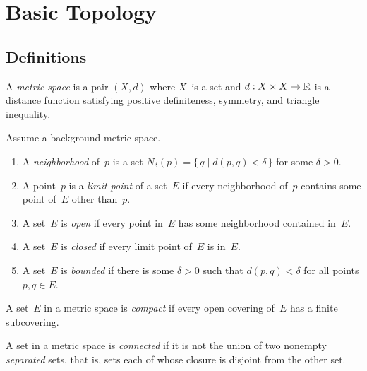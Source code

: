 %
%
%
\section{Basic Topology}
\subsection*{Definitions}
\begin{defn}
A \emph{metric space} is a pair \((X,d)\) where \(X\)~is a set and \(d:X\times X\to\mathbb{R}\) is a distance function satisfying positive definiteness, symmetry, and triangle inequality.
\end{defn}

\begin{defn}
Assume a background metric space.
\begin{enumerate}[itemsep=0pt,label=(\alph{*})]
\item A \emph{neighborhood} of~\(p\) is a set \(N_{\delta}(p)=\{\,q\mid d(p,q)<\delta\,\}\) for some \(\delta>0\).
\item A point~\(p\) is a \emph{limit point} of a set~\(E\) if every neighborhood of~\(p\) contains some point of~\(E\) other than~\(p\).
\item A set~\(E\) is \emph{open} if every point in~\(E\) has some neighborhood contained in~\(E\).
\item A set~\(E\) is \emph{closed} if every limit point of~\(E\) is in~\(E\).
\item A set~\(E\) is \emph{bounded} if there is some \(\delta>0\) such that \(d(p,q)<\delta\) for all points \(p,q\in E\).
\end{enumerate}
\end{defn}

\begin{defn}
A set~\(E\) in a metric space is \emph{compact} if every open covering of~\(E\) has a finite subcovering.
\end{defn}

\begin{defn}
A set in a metric space is \emph{connected} if it is not the union of two nonempty \emph{separated} sets, that is, sets each of whose closure is disjoint from the other set.
\end{defn}

